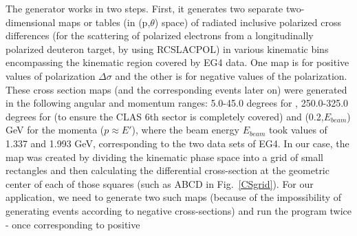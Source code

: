 The generator works in two steps. First, it generates two separate two-dimensional maps or tables (in (p,\cos$\theta$) space) of radiated inclusive polarized cross differences %
(for the scattering of polarized electrons from a longitudinally polarized deuteron target, by using RCSLACPOL) in various kinematic bins encompassing the kinematic region covered by EG4 data. One map is for positive values of polarization $\Delta \sigma$ and the other is for negative values of the polarization.
These cross section maps (and the corresponding events later on) were generated in the following angular and momentum ranges: 5.0-45.0 degrees for \th, 250.0-325.0 degrees for \ph (to ensure the CLAS 6th sector is completely covered) and (0.2,$E_{beam}$) GeV for the momenta ($p \approx E'$), where the beam energy $E_{beam}$ took values of 1.337 and 1.993 GeV, corresponding to the two  data sets of EG4. 
In our case, the map was created by dividing the kinematic phase space into a grid of small rectangles %
and then calculating the differential cross-section at the geometric center of each of those squares (such as ABCD in Fig.~\ref{CSgrid}).
 For our application, we need to generate two such maps (because of the impossibility %
of generating events according to negative cross-sections) and run the program twice - once corresponding to positive %
